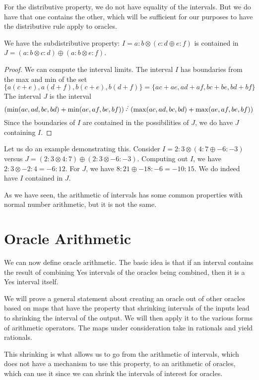 \documentclass[12pt]{article}
\begin{document}
For the distributive property, we do not have equality of the intervals. But we do have that one contains the other, which will be sufficient for our purposes to have the distributive rule apply to oracles. 

\begin{proposition}
We have the subdistributive property: $I = a:b\otimes(c:d \oplus e:f)$ is contained in $J = (a:b \otimes c:d) \oplus (a:b \otimes e:f)$. 
\end{proposition}

\begin{proof}
We can compute the interval limits. The interval $I$ has boundaries from the max and min of the set 
\[
\{a(c+e), a(d+f), b(c+e), b(d+f)\} = \{ac+ae, ad+af, bc+be, bd+bf\}
\] 
The interval $J$ is the interval 
\[
(\min(ac, ad, bc, bd) + \min(ae, af, be, bf) ) \lte (\max(ac, ad, bc, bd) + \max(ae, af, be, bf) )
\]
Since the boundaries of $I$ are contained in the possibilities of $J$, we do have $J$ containing $I$.
\end{proof}

Let us do an example demonstrating this. Consider $I = 2:3 \otimes ( 4:7 \oplus -6:-3)$ versus $J = (2:3 \otimes 4:7) \oplus (2:3 \otimes -6:-3)$. Computing out $I$, we have $2:3 \otimes -2:4 = -6:12$. For $J$, we have $8:21 \oplus -18:-6 = -10: 15$. We do indeed have $I$ contained in $J$.

As we have seen, the arithmetic of intervals has some common properties with normal number arithmetic, but it is not the same.

\section{Oracle Arithmetic}

We can now define oracle arithmetic. The basic idea is that if an interval contains the result of combining Yes intervals of the oracles being combined, then it is a Yes interval itself. 

We will prove a general statement about creating an oracle out of other oracles based on maps that have the property that shrinking intervals of the inputs lead to shrinking the interval of the output. We will then apply it to the various forms of arithmetic operators. The maps under consideration take in rationals and yield rationals. 

This shrinking is what allows us to go from the arithmetic of intervals, which does not have a mechanism to use this property, to an arithmetic of oracles, which can use it since we can shrink the intervals of interest for oracles. 
\end{document}
